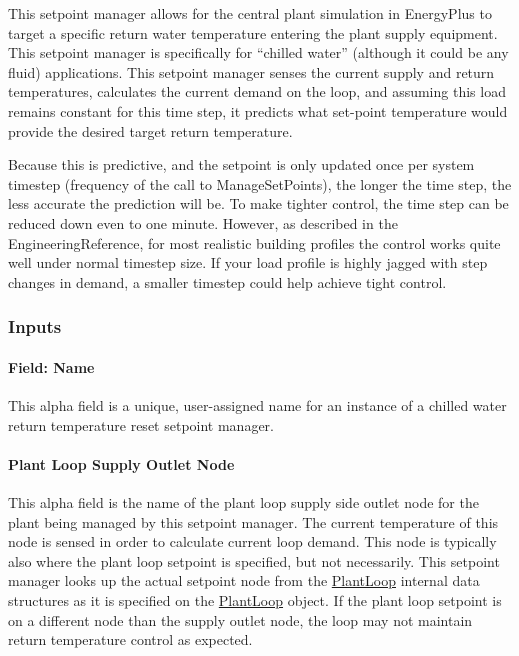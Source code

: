 This setpoint manager allows for the central plant simulation in EnergyPlus to target a specific return water temperature entering the plant supply equipment. This setpoint manager is specifically for ``chilled water'' (although it could be any fluid) applications. This setpoint manager senses the current supply and return temperatures, calculates the current demand on the loop, and assuming this load remains constant for this time step, it predicts what set-point temperature would provide the desired target return temperature.

Because this is predictive, and the setpoint is only updated once per system timestep (frequency of the call to ManageSetPoints), the longer the time step, the less accurate the prediction will be. To make tighter control, the time step can be reduced down even to one minute. However, as described in the EngineeringReference, for most realistic building profiles the control works quite well under normal timestep size. If your load profile is highly jagged with step changes in demand, a smaller timestep could help achieve tight control.

\subsubsection{Inputs}\label{inputs-26-001}

\paragraph{Field: Name}\label{field-name-27-001}

This alpha field is a unique, user-assigned name for an instance of a chilled water return temperature reset setpoint manager.

\paragraph{Plant Loop Supply Outlet Node}\label{plant-loop-supply-outlet-node}

This alpha field is the name of the plant loop supply side outlet node for the plant being managed by this setpoint manager. The current temperature of this node is sensed in order to calculate current loop demand. This node is typically also where the plant loop setpoint is specified, but not necessarily. This setpoint manager looks up the actual setpoint node from the \hyperref[plantloop]{PlantLoop} internal data structures as it is specified on the \hyperref[plantloop]{PlantLoop} object. If the plant loop setpoint is on a different node than the supply outlet node, the loop may not maintain return temperature control as expected.

